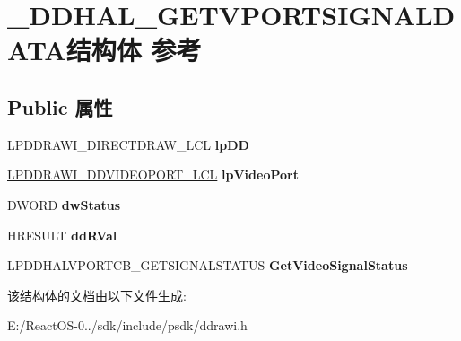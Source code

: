 \hypertarget{struct___d_d_h_a_l___g_e_t_v_p_o_r_t_s_i_g_n_a_l_d_a_t_a}{}\section{\+\_\+\+D\+D\+H\+A\+L\+\_\+\+G\+E\+T\+V\+P\+O\+R\+T\+S\+I\+G\+N\+A\+L\+D\+A\+T\+A结构体 参考}
\label{struct___d_d_h_a_l___g_e_t_v_p_o_r_t_s_i_g_n_a_l_d_a_t_a}
\subsection*{Public 属性}
\begin{DoxyCompactItemize}
\item 
\mbox{\label{struct___d_d_h_a_l___g_e_t_v_p_o_r_t_s_i_g_n_a_l_d_a_t_a_a819c5959da23d2a9eadf6dec9da09a4a}} 
L\+P\+D\+D\+R\+A\+W\+I\+\_\+\+D\+I\+R\+E\+C\+T\+D\+R\+A\+W\+\_\+\+L\+CL {\bfseries lp\+DD}
\item 
\mbox{\label{struct___d_d_h_a_l___g_e_t_v_p_o_r_t_s_i_g_n_a_l_d_a_t_a_a615ef8ea847769d3a81bb7a47c1449f6}} 
\hyperlink{struct___d_d_r_a_w_i___d_d_v_i_d_e_o_p_o_r_t___l_c_l}{L\+P\+D\+D\+R\+A\+W\+I\+\_\+\+D\+D\+V\+I\+D\+E\+O\+P\+O\+R\+T\+\_\+\+L\+CL} {\bfseries lp\+Video\+Port}
\item 
\mbox{\label{struct___d_d_h_a_l___g_e_t_v_p_o_r_t_s_i_g_n_a_l_d_a_t_a_a9347faecb1112ee72ae9fd355991fa1a}} 
D\+W\+O\+RD {\bfseries dw\+Status}
\item 
\mbox{\label{struct___d_d_h_a_l___g_e_t_v_p_o_r_t_s_i_g_n_a_l_d_a_t_a_a73af2da6a493a4316a03a5ad200253d3}} 
H\+R\+E\+S\+U\+LT {\bfseries dd\+R\+Val}
\item 
\mbox{\label{struct___d_d_h_a_l___g_e_t_v_p_o_r_t_s_i_g_n_a_l_d_a_t_a_af1a230df29979acaac4ad950706e6c90}} 
L\+P\+D\+D\+H\+A\+L\+V\+P\+O\+R\+T\+C\+B\+\_\+\+G\+E\+T\+S\+I\+G\+N\+A\+L\+S\+T\+A\+T\+US {\bfseries Get\+Video\+Signal\+Status}
\end{DoxyCompactItemize}


该结构体的文档由以下文件生成\+:\begin{DoxyCompactItemize}
\item 
E\+:/\+React\+O\+S-\/0../sdk/include/psdk/ddrawi.\+h\end{DoxyCompactItemize}
